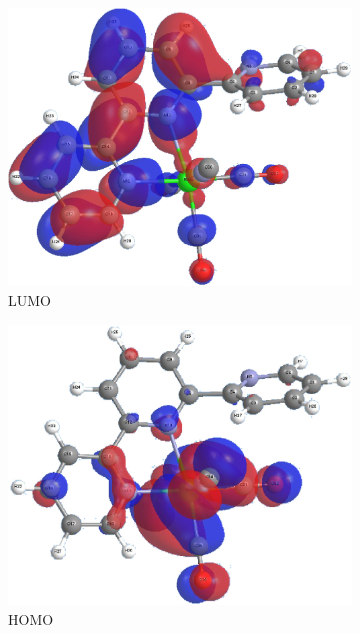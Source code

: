 \begin{figure}[!ht]
\begin{subfigure}[b]{0.31\textwidth}
  \includegraphics[clip=true, width=\textwidth, keepaspectratio]{images/mos/5l.eps}
  \caption{LUMO}
 \end{subfigure}
 \begin{subfigure}[b]{0.31\textwidth}
  \includegraphics[clip=true, width=\textwidth, keepaspectratio]{images/mos/5h.eps}
  \caption{HOMO}
 \end{subfigure}
 \begin{subfigure}[b]{0.31\textwidth}

\end{subfigure}
\end{figure}
